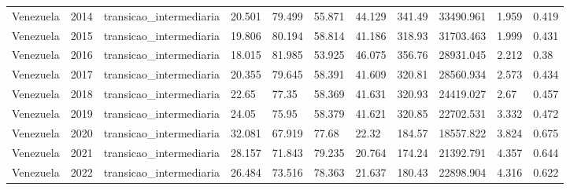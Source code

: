 \begin{table}[htbp]
\begin{tabular}{lllllllllll}
Venezuela & 2014 & transicao\_intermediaria & 20.501 & 79.499 & 55.871 & 44.129 & 341.49 & 33490.961 & 1.959 & 0.419 \\
Venezuela & 2015 & transicao\_intermediaria & 19.806 & 80.194 & 58.814 & 41.186 & 318.93 & 31703.463 & 1.999 & 0.431 \\
Venezuela & 2016 & transicao\_intermediaria & 18.015 & 81.985 & 53.925 & 46.075 & 356.76 & 28931.045 & 2.212 & 0.38 \\
Venezuela & 2017 & transicao\_intermediaria & 20.355 & 79.645 & 58.391 & 41.609 & 320.81 & 28560.934 & 2.573 & 0.434 \\
Venezuela & 2018 & transicao\_intermediaria & 22.65 & 77.35 & 58.369 & 41.631 & 320.93 & 24419.027 & 2.67 & 0.457 \\
Venezuela & 2019 & transicao\_intermediaria & 24.05 & 75.95 & 58.379 & 41.621 & 320.85 & 22702.531 & 3.332 & 0.472 \\
Venezuela & 2020 & transicao\_intermediaria & 32.081 & 67.919 & 77.68 & 22.32 & 184.57 & 18557.822 & 3.824 & 0.675 \\
Venezuela & 2021 & transicao\_intermediaria & 28.157 & 71.843 & 79.235 & 20.764 & 174.24 & 21392.791 & 4.357 & 0.644 \\
Venezuela & 2022 & transicao\_intermediaria & 26.484 & 73.516 & 78.363 & 21.637 & 180.43 & 22898.904 & 4.316 & 0.622 \\
\hline
\end{tabular}
\end{table}
